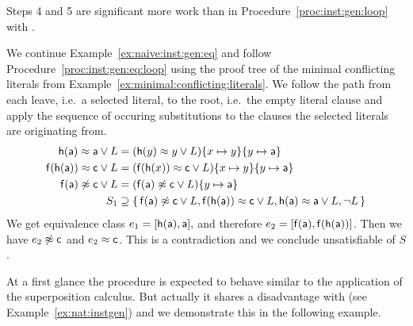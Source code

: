 Steps 4 and 5 are significant more work than in Procedure~\vref{proc:inst:gen:loop} with \InstGen.

\begin{example}
	We continue Example~\ref{ex:naive:inst:gen:eq} 
	and follow Procedure~\ref{proc:inst:gen:eq:loop}
	using the proof tree of the minimal conflicting literals 
	from Example~\ref{ex:minimal:conflicting:literals}.
	We follow the path from each leave, i.e.~a selected literal, 
	to the root, i.e.~the empty literal clause
	and apply the sequence of occuring substitutions 
	to the clauses the selected literals are originating from.
	\begin{align*}
		 \mathsf{h}(\mathsf{a})\approx \mathsf{a} \lor L&=
		 (\mathsf{h}(y)\approx y \lor L)\{ x\mapsto y \}\{ y\mapsto \mathsf{a} \}
		 \\
		 \mathsf{f}(\mathsf{h}(\mathsf{a}))\approx\mathsf{c} \lor L&=
		 (\mathsf{f}(\mathsf{h}(x))\approx \mathsf{c}\lor L)\{ x\mapsto y \}\{ y\mapsto \mathsf{a} \}
		 \\
		 \mathsf{f}(\mathsf{a})\not\approx \mathsf{c} \lor L&=
		 (\mathsf{f}(\mathsf{a})\not\approx \mathsf{c}\lor L)\{ y\mapsto \mathsf{a} \}
		 \\
		S_1 &\supseteq \{ \, 
			\mathsf{f}(\mathsf{a}) \not\approx \mathsf{c}\lor L,
			\mathsf{f}(\mathsf{h}(\mathsf{a}))\approx \mathsf{c}\lor L, 
			\mathsf{h}(\mathsf{a})\approx \mathsf{a} \lor L,
			\lnot L
		 \, \}
	\end{align*}
	We get equivalence class \( e_1 = [ \mathsf{h}(\mathsf{a}), \mathsf{a}], \) and therefore \( e_2 = [ \mathsf{f}(\mathsf{a}), \mathsf{f}(\mathsf{h}(\mathsf{a}))] \).
	Then we have \( e_2 \not\approx \mathsf{c} \)
	and \( e_2 \approx \mathsf{c} \).
	This is a contradiction and we conclude unsatisfiable of \( S \).


\end{example}



At a first glance the \InstGenEQ{} procedure is expected to behave similar to the application of the superposition calculus.
But actually it shares a disadvantage with \InstGen (see Example~\vref{ex:nat:instgen})
and we demonstrate this in the following example.



